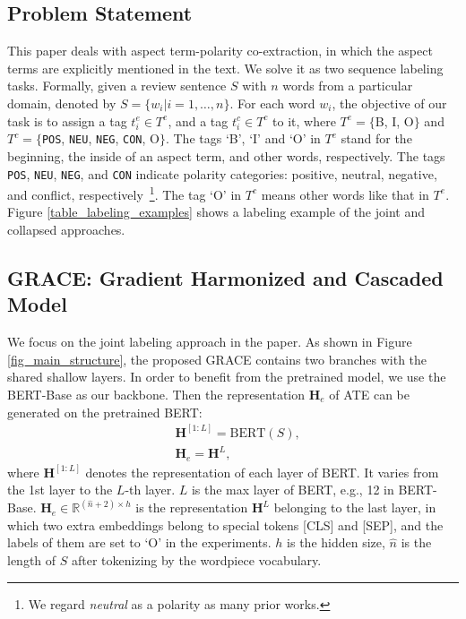 \documentclass[11pt,a4paper]{article}
\begin{document}
\subsection{Problem Statement}
This paper deals with aspect term-polarity co-extraction, in which the aspect terms are explicitly mentioned in the text. We solve it as two sequence labeling tasks. Formally, given a review sentence $S$ with $n$ words from a particular domain, denoted by $S=\{w_i | i = 1, \dots, n\}$. For each word $w_i$, the objective of our task is to assign a tag $t^e_i \in T^e$, and a tag $t^c_i \in T^c$ to it, where $T^e=\{$B, I, O$\}$ and $T^c=\{$\texttt{POS}, \texttt{NEU}, \texttt{NEG}, \texttt{CON}, O$\}$. The tags `B', `I' and `O' in $T^e$ stand for the beginning, the inside of an aspect term, and other words, respectively. The tags \texttt{POS}, \texttt{NEU}, \texttt{NEG}, and \texttt{CON} indicate polarity categories: positive, neutral, negative, and conflict, respectively~\footnote{We regard \textit{neutral} as a polarity as many prior works.}. The tag `O' in $T^c$ means other words like that in $T^e$. Figure \ref{table_labeling_examples} shows a labeling example of the joint and collapsed approaches.

\subsection{GRACE: Gradient Harmonized and Cascaded Model}
\label{sec_grace_mdoel}
We focus on the joint labeling approach in the paper. As shown in Figure \ref{fig_main_structure}, the proposed GRACE contains two branches with the shared shallow layers. In order to benefit from the pretrained model, we use the BERT-Base as our backbone. Then the representation $\mathbf{H}_{e}$ of ATE can be generated on the pretrained BERT:
\begin{align}
    &\mathbf{H}^{[1:L]} = \text{BERT}(S), \\
    &\mathbf{H}_{e} = \mathbf{H}^{L}, \label{eq_bert_ate}
\end{align}
where $\mathbf{H}^{[1:L]}$ denotes the representation of each layer of BERT. It varies from the 1st layer to the $L$-th layer. $L$ is the max layer of BERT, e.g., 12 in BERT-Base.  $\mathbf{H}_{e} \in \mathbb{R}^{(\hat{n}+2) \times h}$ is the representation $\mathbf{H}^{L}$ belonging to the last layer, in which two extra embeddings belong to special tokens [CLS] and [SEP], and the labels of them are set to `O' in the experiments. $h$ is the hidden size, $\hat{n}$ is the length of $S$ after tokenizing by the wordpiece vocabulary.
\end{document}
